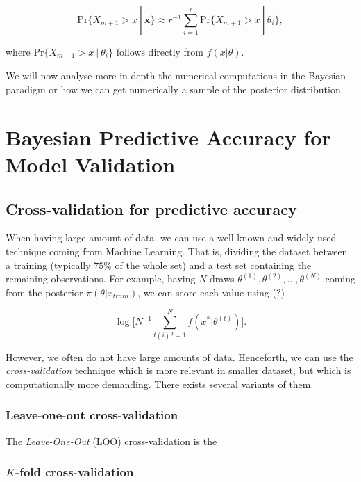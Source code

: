 \documentclass[11pt,a4paper,openany ]{book}
\begin{document}
\begin{equation}
\text{Pr}\{X_{m+1}>x\ | \ \boldsymbol{x}\}\approx r^{-1}\sum_{i=1}^r\text{Pr}\{X_{m+1}>x \ | \ \theta_i\},
\end{equation}

where $\text{Pr}\{X_{m+1}>x \ | \ \theta_i\}$ follows directly from $f(x|\theta)$. 

We will now analyse more in-depth the numerical computations in the Bayesian paradigm or how we can get numerically a sample of the posterior distribution.



\section{Bayesian Predictive Accuracy for Model Validation}

\subsection{Cross-validation for predictive accuracy}

When having large amount of data, we can use a well-known and widely used technique coming from Machine Learning. That is, dividing the dataset between a training (typically $75\%$ of the whole set) and a test set containing the remaining observations.
For example, having $N$ draws $\theta^{(1)},\theta^{(2)},\dots,\theta^{(N)}$ coming from the posterior $\pi(\theta|x_{train})$, we can score each value using (?)


\begin{equation}
\log\bigg[N^{-1}\sum_{t(i)?=1}^N f(x^*|\theta^{(t)})\bigg].
\end{equation}

However, we often do not have large amounts of data. Henceforth, we can use the \emph{cross-validation} technique which is more relevant in smaller dataset, but which is computationally more demanding. There exists several variants of them. 

\subsubsection*{Leave-one-out cross-validation}

The \emph{Leave-One-Out} (LOO) cross-validation is the 


\subsubsection*{$K$-fold cross-validation}
\end{document}
